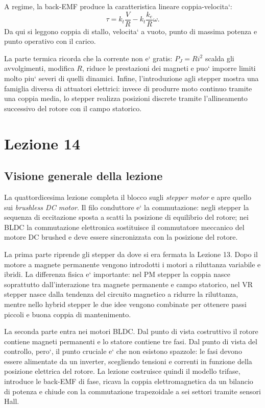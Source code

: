\documentclass[11pt,a4paper]{article}
\begin{document}
A regime, la back-EMF produce la caratteristica lineare coppia-velocita`:
\[
\tau=k_t\frac{V}{R}-k_t\frac{k_e}{R}\omega.
\]
Da qui si leggono coppia di stallo, velocita` a vuoto, punto di massima potenza e punto operativo con il carico.

La parte termica ricorda che la corrente non e` gratis: \(P_J=Ri^2\) scalda gli avvolgimenti, modifica \(R\), riduce le prestazioni dei magneti e puo` imporre limiti molto piu` severi di quelli dinamici. Infine, l'introduzione agli stepper mostra una famiglia diversa di attuatori elettrici: invece di produrre moto continuo tramite una coppia media, lo stepper realizza posizioni discrete tramite l'allineamento successivo del rotore con il campo statorico.


\clearpage
\section{Lezione 14}

\subsection{Visione generale della lezione}

La quattordicesima lezione completa il blocco sugli \emph{stepper motor} e apre quello sui \emph{brushless DC motor}. Il filo conduttore e` la commutazione: negli stepper la sequenza di eccitazione sposta a scatti la posizione di equilibrio del rotore; nei BLDC la commutazione elettronica sostituisce il commutatore meccanico del motore DC brushed e deve essere sincronizzata con la posizione del rotore.

La prima parte riprende gli stepper da dove si era fermata la Lezione 13. Dopo il motore a magnete permanente vengono introdotti i motori a riluttanza variabile e ibridi. La differenza fisica e` importante: nel PM stepper la coppia nasce soprattutto dall'interazione tra magnete permanente e campo statorico, nel VR stepper nasce dalla tendenza del circuito magnetico a ridurre la riluttanza, mentre nello hybrid stepper le due idee vengono combinate per ottenere passi piccoli e buona coppia di mantenimento.

La seconda parte entra nei motori BLDC. Dal punto di vista costruttivo il rotore contiene magneti permanenti e lo statore contiene tre fasi. Dal punto di vista del controllo, pero`, il punto cruciale e` che non esistono spazzole: le fasi devono essere alimentate da un inverter, scegliendo tensioni e correnti in funzione della posizione elettrica del rotore. La lezione costruisce quindi il modello trifase, introduce le back-EMF di fase, ricava la coppia elettromagnetica da un bilancio di potenza e chiude con la commutazione trapezoidale a sei settori tramite sensori Hall.
\end{document}
